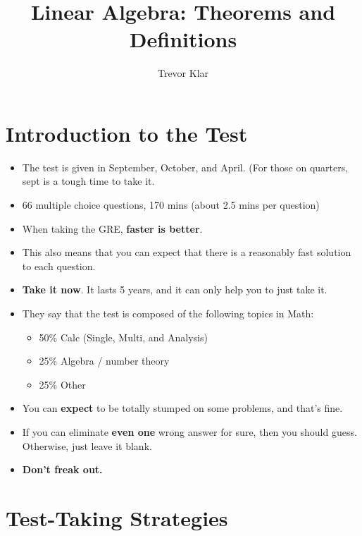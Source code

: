 \documentclass[a5paper]{article}
\title{Linear Algebra: Theorems and Definitions}
\author{Trevor Klar}
\theoremstyle{definition}%
\numberwithin{theorem}{section} %
\begin{document}
\maketitle

\section{Introduction to the Test}

\begin{itemize}
\item The test is given in September, October, and April. (For those on quarters, sept is a tough time to take it. 
\item 66 multiple choice questions, 170 mins (about 2.5 mins per question)
\item When taking the GRE, \textbf{faster is better}.
\item This also means that you can expect that there is a reasonably fast solution to each question. 
\item \textbf{Take it now}. It lasts 5 years, and it can only help you to just take it. 


\item{They say that the test is composed of the following topics in Math:
\begin{itemize}
\item 50\% Calc (Single, Multi, and Analysis)
\item 25\% Algebra / number theory
\item 25\% Other
\end{itemize}}

\item You can \textbf{expect} to be totally stumped on some problems, and that's fine. 
\item If you can eliminate \textbf{even one} wrong answer for sure, then you should guess. Otherwise, just leave it blank. 
\item \textbf{Don't freak out.}
\end{itemize}

\section{Test-Taking Strategies}
\end{document}
